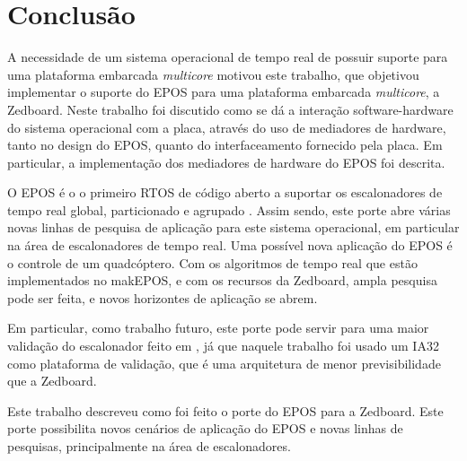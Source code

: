 \chapter{Conclusão}


A necessidade de um sistema operacional de tempo real de possuir suporte para uma plataforma embarcada \emph{multicore} motivou este trabalho, que objetivou implementar o suporte do EPOS para uma plataforma embarcada \emph{multicore}, a Zedboard.
Neste trabalho foi discutido como se dá a interação software-hardware do sistema operacional com a placa, através do uso de mediadores de hardware, tanto no design do EPOS, quanto do interfaceamento fornecido pela placa. Em particular, a implementação dos mediadores de hardware do EPOS foi descrita.


O EPOS é o o primeiro RTOS de código aberto a suportar os escalonadores de tempo real global, particionado e agrupado \cite{gio}. Assim sendo, este porte abre várias novas linhas de pesquisa de aplicação para este sistema operacional, em particular na área de escalonadores de tempo real.
Uma possível nova aplicação do EPOS é o controle de um quadcóptero. Com os algoritmos de tempo real que estão implementados no makEPOS, e com os recursos da Zedboard, ampla pesquisa pode ser feita, e novos horizontes de aplicação se abrem.

Em particular, como trabalho futuro, este porte pode servir para uma maior validação do escalonador feito em \cite{gio}, já que naquele trabalho foi usado um IA32 como plataforma de validação, que é uma arquitetura de menor previsibilidade que a Zedboard.



Este trabalho descreveu como foi feito o porte do EPOS para a Zedboard. Este porte possibilita novos cenários de aplicação do EPOS e novas linhas de pesquisas, principalmente na área de escalonadores.
